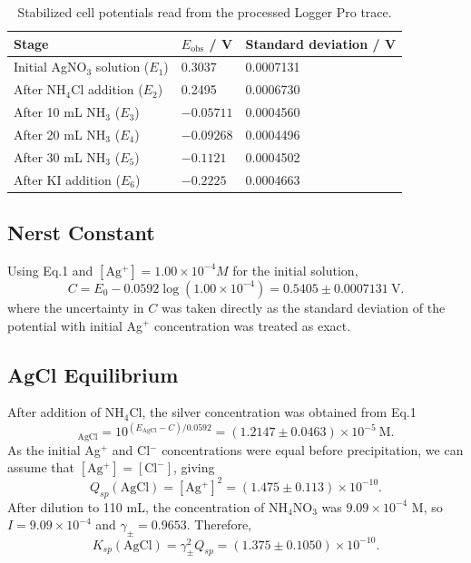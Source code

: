 \documentclass[12pt]{article}
\begin{document}
\begin{table}[htb!]
\centering
\caption{Stabilized cell potentials read from the processed Logger Pro trace.}
\label{tab:plateaus}
\begin{tabular}{lll}
\toprule
Stage & $E_{\mathrm{obs}}$ / V & Standard deviation / V \\
\midrule
Initial AgNO$_3$ solution ($E_1$) & 0.3037 & 0.0007131 \\
After NH$_4$Cl addition ($E_2$) & 0.2495 & 0.0006730 \\
After 10 mL NH$_3$ ($E_3$) & $-0.05711$ & 0.0004560 \\
After 20 mL NH$_3$ ($E_4$) & $-0.09268$ & 0.0004496 \\
After 30 mL NH$_3$ ($E_5$) & $-0.1121$ & 0.0004502 \\
After KI addition ($E_6$) & $-0.2225$ & 0.0004663 \\
\bottomrule
\end{tabular}
\end{table}

\subsection*{Nerst Constant}
Using Eq.1 and $[\mathrm{Ag^+}]=1.00\times 10^{-4}{M}$ for the initial solution,
\begin{equation}
C=E_0-0.0592\log(1.00\times10^{-4})=0.5405\pm0.0007131\ \mathrm{V}.
\end{equation}
where the uncertainty in $C$ was taken directly as the standard deviation of the potential with initial Ag$^+$ concentration was treated as exact.

\subsection*{AgCl Equilibrium}
After addition of NH$_4$Cl, the silver concentration was obtained from Eq.1
\begin{equation}
[\mathrm{Ag^+}]_{\mathrm{AgCl}} = 10^{(E_{\mathrm{AgCl}}-C)/0.0592} = (1.2147\pm0.0463)\times10^{-5}\ \mathrm{M}.
\end{equation}
As the initial Ag$^+$ and Cl$^-$ concentrations were equal before precipitation, we can assume that $[\mathrm{Ag^+}]=[\mathrm{Cl^-}]$, giving
\begin{equation}
Q_{sp}(\mathrm{AgCl})=[\mathrm{Ag^+}]^2=(1.475\pm0.113)\times10^{-10}.
\end{equation}
After dilution to 110 mL, the concentration of NH$_4$NO$_3$ was $9.09\times10^{-4}$ M, so $I=9.09\times10^{-4}$ and $\gamma_{\pm}=0.9653$. Therefore,
\begin{equation}
K_{sp}(\mathrm{AgCl})=\gamma_{\pm}^{2}Q_{sp}=(1.375\pm0.1050)\times10^{-10}.
\end{equation}
\end{document}
